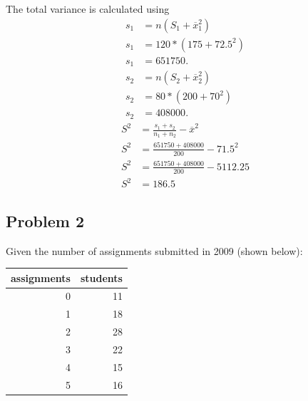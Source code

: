 \documentclass[11pt]{article}
\begin{document}
The total variance is calculated using
\begin{equation*}
  \begin{aligned}
    s_1 &= n(S_1 + \overline{x}^2_1) \\
    s_1 &= 120 * (175 + 72.5^2) \\
    s_1 &= 651750. \\
    s_2 &= n(S_2 + \overline{x}^2_2) \\
    s_2 &= 80 * (200 + 70^2) \\
    s_2 &= 408000.
  \end{aligned}
\end{equation*}
\begin{equation*}
  \begin{aligned}
    S^2 &= \frac{s_1 + s_2}{n_1 + n_2} - \overline{x}^2 \\
    S^2 &= \frac{651750 + 408000}{200} - 71.5^2 \\
    S^2 &= \frac{651750 + 408000}{200} - 5112.25 \\
    S^2 &= 186.5
  \end{aligned}
\end{equation*}
\subsection{Problem 2}
\label{sec-1-2}
Given the number of assignments submitted in 2009 (shown below):

\begin{center}
\begin{tabular}{rr}
assignments & students\\
\hline
0 & 11\\
1 & 18\\
2 & 28\\
3 & 22\\
4 & 15\\
5 & 16\\
\end{tabular}
\end{center}
\end{document}
